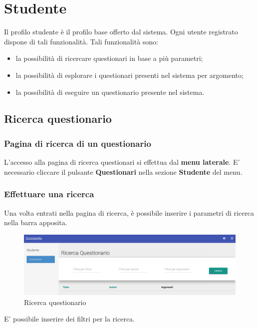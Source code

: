 \documentclass[12pt,a4paper]{article}
\begin{document}
	\newpage

	\section{Studente}\label{studente}
	Il profilo studente è il profilo  base offerto dal sistema. Ogni utente registrato dispone di tali funzionalità. Tali funzionalità sono:
	\begin{itemize}
		\item la possibilità di ricercare questionari in base a più parametri;
		\item la possibilità di esplorare i questionari presenti nel sistema per argomento;
		\item la possibilità di eseguire un questionario presente nel sistema.
	\end{itemize}
	
	\subsection{Ricerca questionario}\label{ricerca_questionario}
	\subsubsection{Pagina di ricerca  di un questionario}
	L'accesso alla pagina di ricerca questionari si effettua dal \textbf{menu laterale}. 
	E' necessario cliccare il pulsante \textbf{Questionari} nella sezione \textbf{Studente} del menu.
	\subsubsection{Effettuare una ricerca}
	Una volta entrati nella pagina di ricerca, è possibile inserire i parametri di ricerca nella barra apposita.
	
	\begin{figure}[H]	
		\centering
		\includegraphics[width=1.0\linewidth]{../img/screenshot/ricercaQuestionario.png}
		\caption{Ricerca questionario}
		\label{Ricerca questionario}
	\end{figure}
	
	E' possibile inserire dei filtri per la ricerca. 
	
\end{document}
